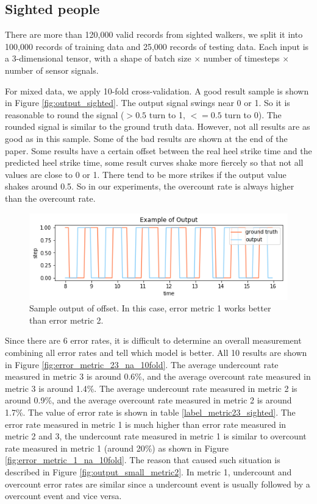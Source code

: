 \documentclass[11pt]{article}
\begin{document}
\subsection{Sighted people}
There are more than 120,000 valid records from sighted walkers, we split it into 100,000 records of training data and 25,000 records of testing data. Each input is a 3-dimensional tensor, with a shape of batch size $\times$ number of timesteps $\times$ number of sensor signals.

For mixed data, we apply 10-fold cross-validation. A good result sample is shown in Figure \ref{fig:output_sighted}. The output signal swings near 0 or 1. So it is reasonable to round the signal ($>0.5$ turn to 1, $<=0.5$ turn to 0). The rounded signal is similar to the ground truth data. However, not all results are as good as in this sample. Some of the bad results are shown at the end of the paper. Some results have a certain offset between the real heel strike time and the predicted heel strike time, some result curves shake more fiercely so that not all values are close to 0 or 1. There tend to be more strikes if the output value shakes around 0.5. So in our experiments, the overcount rate is always higher than the overcount rate.

\begin{figure}[ht]
\centering
\includegraphics[scale=0.4]{output_ex_offset}
\caption{Sample output of offset. In this case, error metric 1 works better than error metric 2.}
\label{fig:output_ex_offset}
\end{figure}


Since there are 6 error rates, it is difficult to determine an overall measurement combining all error rates and tell which model is better. All 10 results are shown in Figure \ref{fig:error_metric_23_na_10fold}.
The average undercount rate measured in metric 3 is around 0.6\%, and the average overcount rate measured in metric 3 is around 1.4\%.  
The average undercount rate measured in metric 2 is around 0.9\%, and the average overcount rate measured in metric 2 is around 1.7\%.  
The value of error rate is shown in table \ref{label_metric23_sighted}. The error rate measured in metric 1 is much higher than error rate measured in metric 2 and 3, the undercount rate measured in metric 1 is similar to overcount rate measured in metric 1 (around 20\%) as shown in Figure \ref{fig:error_metric_1_na_10fold}. The reason that caused such situation is described in Figure \ref{fig:output_small_metric2}. In metric 1, undercount and overcount error rates are similar since a undercount event is usually followed by a overcount event and vice versa.
\end{document}
